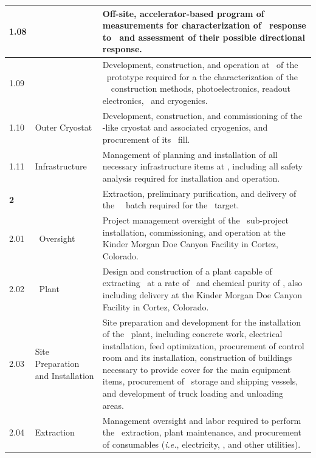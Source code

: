\begin{table}[t]
{\begin{tabular}{@{}p{1.2cm}@{}@{}p{6.7cm}@{}@{}p{12.5cm}@{} }
\hline
\multirow{1}{*}{1.08} 					&\ReD									&Off-site, accelerator-based program of measurements for characterization of \LArTPCs\ response to \NRs\ and assessment of their possible directional response.\\
\hline
\multirow{1}{*}{1.09} 					&\DSp									&Development, construction, and operation at \CERN\ of the \DSpApproximateMass\ prototype required for a the characterization of the \DSks\ \LArTPC\ construction methods, photoelectronics, readout electronics, \DAQ\ and cryogenics.\\
\hline
\multirow{1}{*}{1.10} 					&Outer Cryostat							&Development, construction, and commissioning of the \pDUNE-like cryostat and associated cryogenics, and procurement of its \AAr\ fill.\\
\hline
\multirow{1}{*}{1.11} 					&Infrastructure							&Management of planning and installation of all necessary infrastructure items at \LNGS, including all safety analysis required for installation and operation.\\
\hline\hline
\multirow{1}{*}{\bf 2} 					&{\bf \Urania}							&Extraction, preliminary purification, and delivery of the \UraniaTotalDSkProduction\ \UAr\ batch required for the \DSk\ target.\\
\hline
\multirow{1}{*}{2.01} 					&\Urania\ Oversight						&Project management oversight of the \Urania\ sub-project installation, commissioning, and operation at the Kinder Morgan Doe Canyon Facility in Cortez, Colorado.\\
\hline
\multirow{1}{*}{2.02} 					&\Urania\ Plant							&Design and construction of a plant capable of extracting \UAr\ at a rate of \UraniaUArRate\ and chemical purity of \UraniaArFinalPurity, also including delivery at the Kinder Morgan Doe Canyon Facility in Cortez, Colorado.\\
\hline
\multirow{1}{*}{2.03} 					&Site Preparation and Installation		&Site preparation and development for the installation of the \Urania\ plant, including concrete work, electrical installation, feed optimization, procurement of control room and its installation, construction of buildings necessary to provide cover for the main equipment items, procurement of \UAr\ storage and shipping vessels, and development of truck loading and unloading areas.\\
\hline
\multirow{1}{*}{2.04} 					&Extraction								&Management oversight and labor required to perform the \UAr\ extraction, plant maintenance, and procurement of consumables ({\it i.e.}, electricity, \LIN, and other utilities).\\

\end{tabular}}
\end{table}
